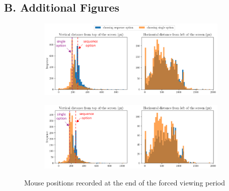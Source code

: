 \documentclass[
  12pt,
]{article}
\begin{document}


\newpage

\hypertarget{b.-additional-figures}{%
\subsection*{B. Additional Figures}\label{b.-additional-figures}}

\begin{figure}
  \centering
  \begin{subfigure}{\textwidth}
    \centering
    \includegraphics[width=\linewidth]{figures/exp3_mouse_intertemporal.png}
  \end{subfigure}
  \begin{subfigure}{\textwidth}
    \vspace{1.5em}
    \centering
    \includegraphics[width=\linewidth]{figures/exp3_mouse_rabbit.png}
  \end{subfigure}
  \caption{Mouse positions recorded at the end of the forced viewing period}
  \label{fig:exp3_mouse_position}
\end{figure}
\end{document}
